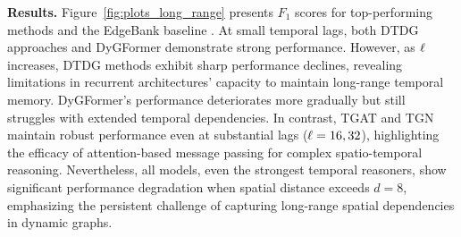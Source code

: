 \textbf{Results.} Figure~\ref{fig:plots_long_range} presents $F_1$ scores for top-performing methods and the EdgeBank baseline 
. At small temporal lags, both DTDG approaches and DyGFormer demonstrate strong performance. However, as $\ell$ increases, DTDG methods exhibit sharp performance declines, revealing limitations in recurrent architectures' capacity to maintain long-range temporal memory. DyGFormer's performance deteriorates more gradually but still struggles with extended temporal dependencies. In contrast, TGAT and TGN maintain robust performance even at substantial lags ($\ell=16,32$), highlighting the efficacy of attention-based message passing for complex spatio-temporal reasoning. Nevertheless, all models, even the strongest temporal reasoners, show significant performance degradation when spatial distance exceeds $d=8$, emphasizing the persistent challenge of capturing long-range spatial dependencies in dynamic graphs.


